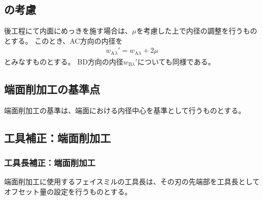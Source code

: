 \subsection{\PlatingThk の考慮}
後工程にて内面にめっきを施す場合は、\PlatingThk$\mu$を考慮した上で内径の調整を行うものとする。
このとき、AC方向の内径を
\begin{align*}
  w_{\mathrm A\lambda}' = w_{\mathrm A\lambda}+2\mu
\end{align*}
とみなすものとする。
BD方向の内径$w_{\mathrm B\lambda}'$についても同様である。



\clearpage


\subsection{端面削加工の基準点}
端面削加工の基準は、端面における内径中心を基準として行うものとする。


\subsection{工具補正：端面削加工}

\subsubsection{工具長補正：端面削加工}
端面削加工に使用するフェイスミルの工具長は、その刃の先端部を工具長としてオフセット量の設定を行うものとする。

